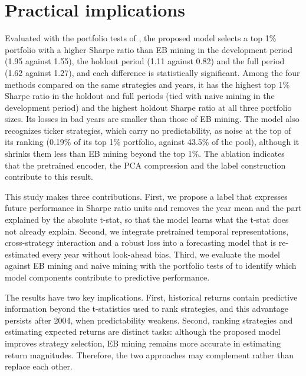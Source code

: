 \documentclass[pdflatex,sn-mathphys-num]{sn-jnl}%
\theoremstyle{thmstyleone}%
\theoremstyle{thmstyletwo}%
\theoremstyle{thmstylethree}%
\begin{document}
\section{Practical implications}
Evaluated with the portfolio tests of \cite{chen2025highthroughputassetpricing}, the proposed model selects a top 1\% portfolio with a higher Sharpe ratio than EB mining in the development period (1.95 against 1.55), the holdout period (1.11 against 0.82) and the full period (1.62 against 1.27), and each difference is statistically significant. Among the four methods compared on the same strategies and years, it has the highest top 1\% Sharpe ratio in the holdout and full periods (tied with naive mining in the development period) and the highest holdout Sharpe ratio at all three portfolio sizes. Its losses in bad years are smaller than those of EB mining. The model also recognizes ticker strategies, which carry no predictability, as noise at the top of its ranking (0.19\% of its top 1\% portfolio, against 43.5\% of the pool), although it shrinks them less than EB mining beyond the top 1\%. The ablation indicates that the pretrained encoder, the PCA compression and the label construction contribute to this result.

This study makes three contributions. First, we propose a label that expresses future performance in Sharpe ratio units and removes the year mean and the part explained by the absolute t-stat, so that the model learns what the t-stat does not already explain. Second, we integrate pretrained temporal representations, cross-strategy interaction and a robust loss into a forecasting model that is re-estimated every year without look-ahead bias. Third, we evaluate the model against EB mining and naive mining with the portfolio tests of \cite{chen2025highthroughputassetpricing} to identify which model components contribute to predictive performance.

The results have two key implications. First, historical returns contain predictive information beyond the t-statistics used to rank strategies, and this advantage persists after 2004, when predictability weakens. Second, ranking strategies and estimating expected returns are distinct tasks: although the proposed model improves strategy selection, EB mining remains more accurate in estimating return magnitudes. Therefore, the two approaches may complement rather than replace each other.
\end{document}
